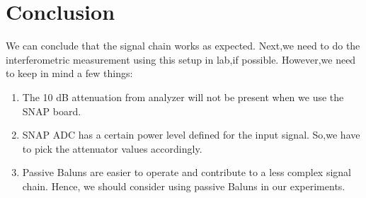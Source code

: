 \documentclass[11pt]{article}
\begin{document}
 \section{Conclusion}
 We can conclude that the signal chain works as expected. Next,we need to do the interferometric measurement using this setup in lab,if possible. However,we need to keep in mind a few things:
 
 \begin{enumerate}
 	\item The 10 dB attenuation from analyzer will not be present when we use the SNAP board. 
 	\item SNAP ADC has a certain power level defined for the input signal. So,we have to pick the attenuator values accordingly.
 	\item Passive Baluns are easier to operate and contribute to a less complex signal chain. Hence, we should consider using passive Baluns in our experiments.
 	
 \end{enumerate}
 
 
\end{document}

